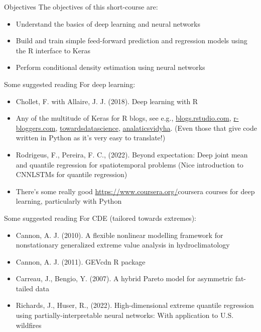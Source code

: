 \documentclass{beamer}
\begin{document}
\begin{frame}{Objectives}
The objectives of this short-course are:
\begin{itemize}
\item Understand the basics of deep learning and neural networks
\item Build and train simple feed-forward prediction and regression models using the R interface to Keras
\item Perform conditional density estimation using neural networks
\end{itemize}
\end{frame}

\begin{frame}{Some suggested reading}
For deep learning:
\begin{itemize}
\item Chollet, F. with Allaire, J. J. (2018). Deep learning with R 
\item Any of the multitude of Keras for R blogs, see e.g., \href{https://blogs.rstudio.com/ai/posts/2019-11-27-gettingstarted-2020/}{blogs.rstudio.com}, \href{https://www.r-bloggers.com/2021/12/using-keras-for-deep-learning-with-r/}{r-bloggers.com}, \href{https://towardsdatascience.com/r-vs-python-image-classification-with-keras-1fa99a8fef9b}{towardsdatascience}, \href{https://www.analyticsvidhya.com/blog/2017/06/getting-started-with-deep-learning-using-keras-in-r/}{analaticsvidyha}. (Even those that give code written in Python as it's very easy to translate!)
\item Rodrigeus, F., Pereira, F. C., (2022). Beyond expectation: Deep joint mean and quantile regression for spatiotemporal problems (Nice introduction to CNNLSTMs for quantile regression)
\item There's some really good \url{https://www.coursera.org/}{coursera} courses for deep learning, particularly with Python
\end{itemize}
\end{frame}

\begin{frame}{Some suggested reading}
For CDE (tailored towards extremes):
\begin{itemize}
\item Cannon, A. J. (2010). A flexible nonlinear modelling framework for nonstationary generalized extreme value analysis in hydroclimatology 
\item Cannon, A. J. (2011). GEVcdn R package
\item  Carreau, J., Bengio, Y. (2007). A hybrid Pareto model for asymmetric fat-tailed data
\item Richards, J., Huser, R., (2022). High-dimensional extreme quantile regression using partially-interpretable neural networks: With application to U.S. wildfires
\end{itemize}
\end{frame}
\end{document}
